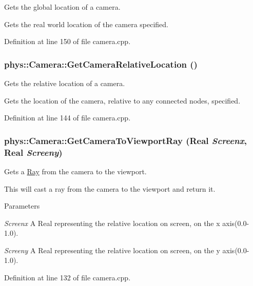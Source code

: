 Gets the global location of a camera. 

Gets the real world location of the camera specified. 

Definition at line 150 of file camera.cpp.

\hypertarget{classphys_1_1Camera_a771fc7005191c3f83ac1fedb09699943}{
\subsubsection[{GetCameraRelativeLocation}]{ phys::Camera::GetCameraRelativeLocation ()}}
\label{d9/df8/classphys_1_1Camera_a771fc7005191c3f83ac1fedb09699943}


Gets the relative location of a camera. 

Gets the location of the camera, relative to any connected nodes, specified. 

Definition at line 144 of file camera.cpp.

\hypertarget{classphys_1_1Camera_a47c437c8755301512c2757f879e03e73}{
\subsubsection[{GetCameraToViewportRay}]{ phys::Camera::GetCameraToViewportRay ({\bf Real} {\em Screenx}, \/  {\bf Real} {\em Screeny})}}
\label{d9/df8/classphys_1_1Camera_a47c437c8755301512c2757f879e03e73}


Gets a \hyperlink{classphys_1_1Ray}{Ray} from the camera to the viewport. 

This will cast a ray from the camera to the viewport and return it. 
\begin{DoxyParams}{Parameters}
\item[{\em Screenx}]A Real representing the relative location on screen, on the x axis(0.0-\/1.0). \item[{\em Screeny}]A Real representing the relative location on screen, on the y axis(0.0-\/1.0). \end{DoxyParams}


Definition at line 132 of file camera.cpp.


